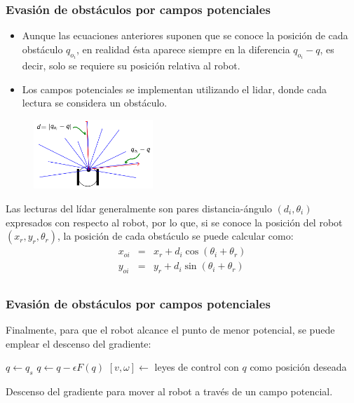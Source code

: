 \begin{frame}\frametitle{Evasión de obstáculos por campos potenciales}
  \begin{itemize}
  \item Aunque las ecuaciones anteriores suponen que se conoce la posición de cada obstáculo $q_{o_i}$, en realidad ésta aparece siempre en la diferencia $q_{o_i} - q$, es decir, solo se requiere su posición relativa al robot.
  \item Los campos potenciales se implementan utilizando el lidar, donde cada lectura se considera un obstáculo. 
  \end{itemize}
  \begin{figure}
    \centering
    \includegraphics[width=0.4\textwidth]{Figures/MotionPlanning/PotFieldsLidar.png}
  \end{figure}
  Las lecturas del lídar generalmente son pares distancia-ángulo $(d_i,\theta_i)$ expresados con respecto al robot, por lo que, si se conoce la posición del robot $(x_r,y_r,\theta_r)$, la posición de cada obstáculo se puede calcular como:
  \begin{eqnarray*}
    x_{oi} &=& x_r + d_i\cos(\theta_i + \theta_r)\\
    y_{oi} &=& y_r + d_i\sin(\theta_i + \theta_r)\\
  \end{eqnarray*}
\end{frame}

\begin{frame}\frametitle{Evasión de obstáculos por campos potenciales}
  Finalmente, para que el robot alcance el punto de menor potencial, se puede emplear el descenso del gradiente:
  \[\]
  \begin{algorithm}[H]
  \DontPrintSemicolon
  \;
$q \leftarrow q_s$\;
{
  $q \leftarrow q - \epsilon F(q)$\;
  $[v,\omega] \leftarrow $ leyes de control con $q$ como posición deseada\;
}
  \caption{Descenso del gradiente para mover al robot a través de un campo potencial.}
  \label{alg:PotFields}
\end{algorithm}
\end{frame}

